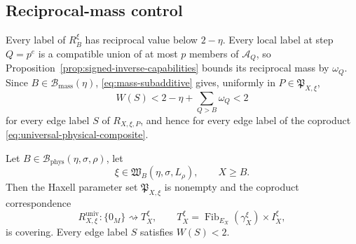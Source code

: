 \subsection{Reciprocal-mass control}

Every label of $R_B^\xi$ has reciprocal value below $2-\eta$.  Every local label at step $Q=p^e$ is a compatible union of at most $p$ members of $\mathcal A_Q$, so Proposition~\ref{prop:signed-inverse-capabilities} bounds its reciprocal mass by $\omega_Q$.  Since $B\in\mathcal B_{\mathrm{mass}}(\eta)$, \eqref{eq:mass-subadditive} gives, uniformly in $P\in\mathfrak P_{X,\xi}$,
\begin{equation}\label{eq:physical-W-less-2}
W(S)
<2-\eta+\sum_{Q>B}\omega_Q
<2
\end{equation}
for every edge label $S$ of $R_{X,\xi,P}$, and hence for every edge label of the coproduct \eqref{eq:universal-physical-composite}.

\begin{proposition}\label{prop:finite-realization}
Let $B\in\mathcal B_{\mathrm{phys}}(\eta,\sigma,\rho)$, let
\[
\xi\in\mathfrak W_B(\eta,\sigma,L_\rho),
\qquad
X\ge B.
\]
Then the Haxell parameter set $\mathfrak P_{X,\xi}$ is nonempty and the coproduct correspondence
\[
R_{X,\xi}^{\mathrm{univ}}:\{0_M\}\rightsquigarrow T_X^\xi,
\qquad
T_X^\xi
=\operatorname{Fib}_{E_X}(\gamma_X^\xi)\times I_X^\xi,
\]
is covering.  Every edge label $S$ satisfies $W(S)<2$.
\end{proposition}
